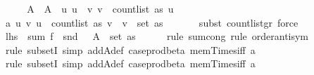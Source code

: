 \begin{isabellebody}
%
\isadelimproof
%
\endisadelimproof
%
\isatagproof
{}\isamarkupfalse%
\ {\isacharminus}{\kern0pt}\isanewline
\ \ \isamarkupfalse%
\ A\ \ {\isachardoublequoteopen}A\ {\isacharequal}{\kern0pt}\ {\isacharparenleft}{\kern0pt}{\isasymlambda}u{\isachardot}{\kern0pt}\ {\isacharbraceleft}{\kern0pt}u{\isacharbraceright}{\kern0pt}\ {\isasymtimes}\ {\isacharbraceleft}{\kern0pt}v{\isachardot}{\kern0pt}\ v\ {\isacharless}{\kern0pt}\ count{\isacharunderscore}{\kern0pt}list\ as\ u{\isacharbraceright}{\kern0pt}{\isacharparenright}{\kern0pt}{\isachardoublequoteclose}\isanewline
\isanewline
\ \ \isamarkupfalse%
\ a\ {\isacharcolon}{\kern0pt}{\isachardoublequoteopen}{\isasymAnd}u\ v{\isachardot}{\kern0pt}\ u\ {\isacharless}{\kern0pt}\ count{\isacharunderscore}{\kern0pt}list\ as\ v\ {\isasymLongrightarrow}\ v\ {\isasymin}\ set\ as{\isachardoublequoteclose}\ \isanewline
\ \ \ \ \isamarkupfalse%
\ {\isacharparenleft}{\kern0pt}subst\ count{\isacharunderscore}{\kern0pt}list{\isacharunderscore}{\kern0pt}gr{\isacharunderscore}{\kern0pt}{}{\isacharcomma}{\kern0pt}\ force{\isacharparenright}{\kern0pt}\isanewline
\isanewline
\ \ \isamarkupfalse%
\ {\isachardoublequoteopen}{\isacharquery}{\kern0pt}lhs\ {\isacharequal}{\kern0pt}\ sum\ {\isacharparenleft}{\kern0pt}f\ {\isasymcirc}\ snd{\isacharparenright}{\kern0pt}\ \ {\isacharparenleft}{\kern0pt}{\isasymUnion}\ {\isacharparenleft}{\kern0pt}A\ {\isacharbackquote}{\kern0pt}\ set\ as{\isacharparenright}{\kern0pt}{\isacharparenright}{\kern0pt}{\isachardoublequoteclose}\isanewline
\ \ \ \ \isamarkupfalse%
\ {\isacharparenleft}{\kern0pt}rule\ sum{\isachardot}{\kern0pt}cong{\isacharcomma}{\kern0pt}\ rule\ order{\isacharunderscore}{\kern0pt}antisym{\isacharparenright}{\kern0pt}\isanewline
\ \ \ \ \isamarkupfalse%
\ {\isacharparenleft}{\kern0pt}rule\ subsetI{\isacharcomma}{\kern0pt}\ simp\ add{\isacharcolon}{\kern0pt}A{\isacharunderscore}{\kern0pt}def\ case{\isacharunderscore}{\kern0pt}prod{\isacharunderscore}{\kern0pt}beta{\isacharprime}{\kern0pt}\ mem{\isacharunderscore}{\kern0pt}Times{\isacharunderscore}{\kern0pt}iff\ a{\isacharparenright}{\kern0pt}\isanewline
\ \ \ \ \isamarkupfalse%
\ {\isacharparenleft}{\kern0pt}rule\ subsetI{\isacharcomma}{\kern0pt}\ simp\ add{\isacharcolon}{\kern0pt}A{\isacharunderscore}{\kern0pt}def\ case{\isacharunderscore}{\kern0pt}prod{\isacharunderscore}{\kern0pt}beta{\isacharprime}{\kern0pt}\ mem{\isacharunderscore}{\kern0pt}Times{\isacharunderscore}{\kern0pt}iff\ a{\isacharparenright}{\kern0pt}\isanewline

\end{isabellebody}
